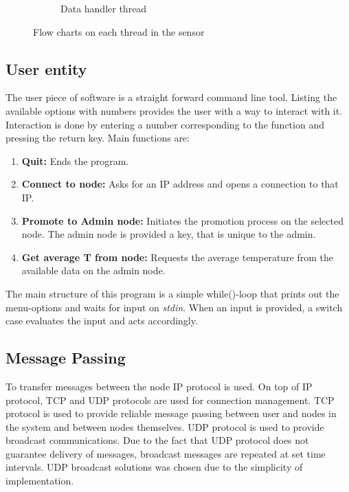 \begin{figure}[ht!]
\begin{subfigure}[b]{0.3\textwidth}
        \caption{Data handler thread}
        \label{fig:datathread}
    \end{subfigure}
    \caption{Flow charts on each thread in the sensor}
    \label{fig:sensorthreads}
\end{figure}

\subsection{User entity}
\label{subsec:userdesign}
The user piece of software is a straight forward command line tool. Listing the available options with numbers provides the user with a way to interact with it. Interaction is done by entering a number corresponding to the function and pressing the return key. Main functions are:
\begin{enumerate}
    \item \textbf{Quit:} Ends the program.
    \item \textbf{Connect to node:} Asks for an IP address and opens a connection to that IP.
    \item \textbf{Promote to Admin node:} Initiates the promotion process on the selected node. The admin node is provided a key, that is unique to the admin.
    \item \textbf{Get average T from node:} Requests the average temperature from the available data on the admin node.
\end{enumerate}
The main structure of this program is a simple while()-loop that prints out the menu-options and waits for input on \textit{stdin}. When an input is provided, a switch case evaluates the input and acts accordingly.

\subsection{Message Passing}
\label{subsec:msgpassing}
To transfer messages between the node IP protocol is used. On top of IP protocol, TCP and UDP protocols are used for connection management. TCP protocol is used to provide reliable message passing between user and nodes in the system and between nodes themselves. UDP protocol is used to provide broadcast communications. Due to the fact that UDP protocol does not guarantee delivery of messages, broadcast messages are repeated at set time intervals. UDP broadcast solutions was chosen due to the simplicity of implementation.

